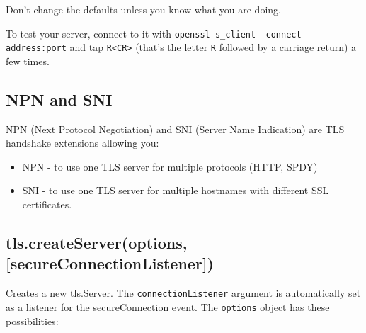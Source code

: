 Don't change the defaults unless you know what you are doing.

To test your server, connect to it with
\texttt{openssl s\_client -connect address:port} and tap
\texttt{R\textless{}CR\textgreater{}} (that's the letter \texttt{R}
followed by a carriage return) a few times.

\subsection{NPN and SNI}

NPN (Next Protocol Negotiation) and SNI (Server Name Indication) are TLS
handshake extensions allowing you:

\begin{itemize}
\item
  NPN - to use one TLS server for multiple protocols (HTTP, SPDY)
\item
  SNI - to use one TLS server for multiple hostnames with different SSL
  certificates.
\end{itemize}

\subsection{tls.createServer(options, {[}secureConnectionListener{]})}

Creates a new \hyperref[tls_class_tls_server]{tls.Server}. The
\texttt{connectionListener} argument is automatically set as a listener
for the \hyperref[tls_event_secureconnection]{secureConnection} event.
The \texttt{options} object has these possibilities:

